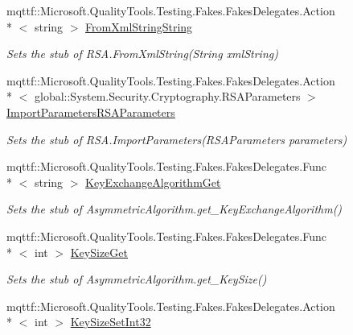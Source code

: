 \begin{DoxyCompactItemize}
mqttf\-::\-Microsoft.\-Quality\-Tools.\-Testing.\-Fakes.\-Fakes\-Delegates.\-Action\\*
$<$ string $>$ \hyperlink{class_system_1_1_security_1_1_cryptography_1_1_fakes_1_1_stub_r_s_a_a1a37c9c83323b9f1d231fcf4555cca2d}{From\-Xml\-String\-String}
\begin{DoxyCompactList}\small\item\em Sets the stub of R\-S\-A.\-From\-Xml\-String(\-String xml\-String)\end{DoxyCompactList}\item 
mqttf\-::\-Microsoft.\-Quality\-Tools.\-Testing.\-Fakes.\-Fakes\-Delegates.\-Action\\*
$<$ global\-::\-System.\-Security.\-Cryptography.\-R\-S\-A\-Parameters $>$ \hyperlink{class_system_1_1_security_1_1_cryptography_1_1_fakes_1_1_stub_r_s_a_a85392f54791e886eb8cd253d037e2afd}{Import\-Parameters\-R\-S\-A\-Parameters}
\begin{DoxyCompactList}\small\item\em Sets the stub of R\-S\-A.\-Import\-Parameters(\-R\-S\-A\-Parameters parameters)\end{DoxyCompactList}\item 
mqttf\-::\-Microsoft.\-Quality\-Tools.\-Testing.\-Fakes.\-Fakes\-Delegates.\-Func\\*
$<$ string $>$ \hyperlink{class_system_1_1_security_1_1_cryptography_1_1_fakes_1_1_stub_r_s_a_ad269639553a12d757867aa8ce9796fca}{Key\-Exchange\-Algorithm\-Get}
\begin{DoxyCompactList}\small\item\em Sets the stub of Asymmetric\-Algorithm.\-get\-\_\-\-Key\-Exchange\-Algorithm()\end{DoxyCompactList}\item 
mqttf\-::\-Microsoft.\-Quality\-Tools.\-Testing.\-Fakes.\-Fakes\-Delegates.\-Func\\*
$<$ int $>$ \hyperlink{class_system_1_1_security_1_1_cryptography_1_1_fakes_1_1_stub_r_s_a_a5051cde4ee431051b8ab862ec93274b8}{Key\-Size\-Get}
\begin{DoxyCompactList}\small\item\em Sets the stub of Asymmetric\-Algorithm.\-get\-\_\-\-Key\-Size()\end{DoxyCompactList}\item 
mqttf\-::\-Microsoft.\-Quality\-Tools.\-Testing.\-Fakes.\-Fakes\-Delegates.\-Action\\*
$<$ int $>$ \hyperlink{class_system_1_1_security_1_1_cryptography_1_1_fakes_1_1_stub_r_s_a_a5f3988906779cd79a04d92ab01ba64ff}{Key\-Size\-Set\-Int32}

\end{DoxyCompactItemize}
